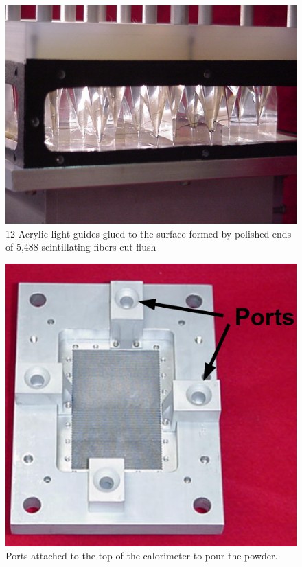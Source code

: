 \begin{figure}[h]
\centering
\includegraphics[width=0.9\linewidth]{images/Fig7_AcryllicGuides.jpg} 
    \caption{12 Acrylic light guides glued to the surface formed by polished ends of 5,488 scintillating fibers cut flush} 
    \label{fig:AcryllicGuides}
\end{figure}

\begin{figure}[h]
\centering
\includegraphics[width=0.9\linewidth]{images/Fig8_Ports_Text.png} 
    \caption{Ports attached to the top of the calorimeter to pour the powder.} 
    \label{fig:Ports}
\end{figure}

